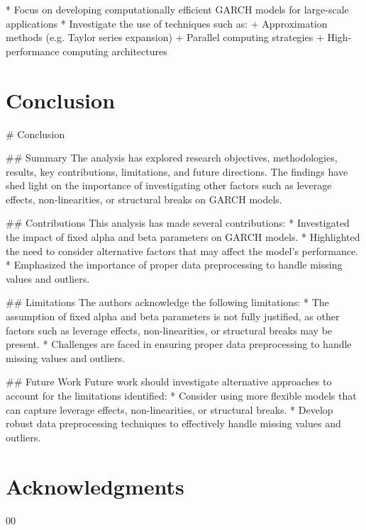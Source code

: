 \documentclass[conference]{IEEEtran}
\begin{document}
* Focus on developing computationally efficient GARCH models for large-scale applications
* Investigate the use of techniques such as:
	+ Approximation methods (e.g. Taylor series expansion)
	+ Parallel computing strategies
	+ High-performance computing architectures

\section{Conclusion}
\# Conclusion

\#\# Summary
The analysis has explored research objectives, methodologies, results, key contributions, limitations, and future directions. The findings have shed light on the importance of investigating other factors such as leverage effects, non-linearities, or structural breaks on GARCH models.

\#\# Contributions
This analysis has made several contributions:
* Investigated the impact of fixed alpha and beta parameters on GARCH models.
* Highlighted the need to consider alternative factors that may affect the model's performance.
* Emphasized the importance of proper data preprocessing to handle missing values and outliers.

\#\# Limitations
The authors acknowledge the following limitations:
* The assumption of fixed alpha and beta parameters is not fully justified, as other factors such as leverage effects, non-linearities, or structural breaks may be present.
* Challenges are faced in ensuring proper data preprocessing to handle missing values and outliers.

\#\# Future Work
Future work should investigate alternative approaches to account for the limitations identified:
* Consider using more flexible models that can capture leverage effects, non-linearities, or structural breaks.
* Develop robust data preprocessing techniques to effectively handle missing values and outliers.

\section*{Acknowledgments}


\begin{thebibliography}{00}

\end{thebibliography}
\end{document}
